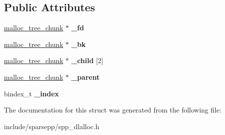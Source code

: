 \subsection*{Public Attributes}
\begin{DoxyCompactItemize}
\item 
\hyperlink{structspp_1_1malloc__tree__chunk}{malloc\+\_\+tree\+\_\+chunk} $\ast$ {\bfseries \+\_\+fd}\hypertarget{structspp_1_1malloc__tree__chunk_af11cb9127faf477a1cc69af5792f809d}{}\label{structspp_1_1malloc__tree__chunk_af11cb9127faf477a1cc69af5792f809d}

\item 
\hyperlink{structspp_1_1malloc__tree__chunk}{malloc\+\_\+tree\+\_\+chunk} $\ast$ {\bfseries \+\_\+bk}\hypertarget{structspp_1_1malloc__tree__chunk_abccded057633cb9d85bc8ebe7888b471}{}\label{structspp_1_1malloc__tree__chunk_abccded057633cb9d85bc8ebe7888b471}

\item 
\hyperlink{structspp_1_1malloc__tree__chunk}{malloc\+\_\+tree\+\_\+chunk} $\ast$ {\bfseries \+\_\+child} \mbox{[}2\mbox{]}\hypertarget{structspp_1_1malloc__tree__chunk_ad9dac7b6d7e36700287c4cfb5013f20e}{}\label{structspp_1_1malloc__tree__chunk_ad9dac7b6d7e36700287c4cfb5013f20e}

\item 
\hyperlink{structspp_1_1malloc__tree__chunk}{malloc\+\_\+tree\+\_\+chunk} $\ast$ {\bfseries \+\_\+parent}\hypertarget{structspp_1_1malloc__tree__chunk_aaf826ebf781542725edc30b024087737}{}\label{structspp_1_1malloc__tree__chunk_aaf826ebf781542725edc30b024087737}

\item 
bindex\+\_\+t {\bfseries \+\_\+index}\hypertarget{structspp_1_1malloc__tree__chunk_a91576b393e660288dc91857881c0f8af}{}\label{structspp_1_1malloc__tree__chunk_a91576b393e660288dc91857881c0f8af}

\end{DoxyCompactItemize}


The documentation for this struct was generated from the following file\+:\begin{DoxyCompactItemize}
\item 
include/sparsepp/spp\+\_\+dlalloc.\+h\end{DoxyCompactItemize}
